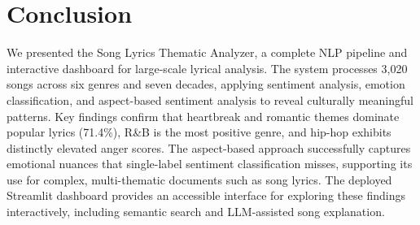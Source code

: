 \documentclass[pdflatex,sn-mathphys-num]{sn-jnl}
\begin{document}
\section{Conclusion}\label{sec9}

We presented the Song Lyrics Thematic Analyzer, a complete NLP pipeline and interactive dashboard for large-scale lyrical analysis. The system processes 3,020 songs across six genres and seven decades, applying sentiment analysis, emotion classification, and aspect-based sentiment analysis to reveal culturally meaningful patterns. Key findings confirm that heartbreak and romantic themes dominate popular lyrics (71.4\%), R\&B is the most positive genre, and hip-hop exhibits distinctly elevated anger scores. The aspect-based approach successfully captures emotional nuances that single-label sentiment classification misses, supporting its use for complex, multi-thematic documents such as song lyrics. The deployed Streamlit dashboard provides an accessible interface for exploring these findings interactively, including semantic search and LLM-assisted song explanation.

\backmatter
\end{document}
